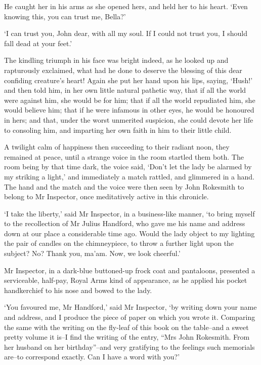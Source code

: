 He caught her in his arms as she opened hers, and held her to his heart.
‘Even knowing this, you can trust me, Bella?’

‘I can trust you, John dear, with all my soul. If I could not trust you,
I should fall dead at your feet.’

The kindling triumph in his face was bright indeed, as he looked up and
rapturously exclaimed, what had he done to deserve the blessing of this
dear confiding creature’s heart! Again she put her hand upon his lips,
saying, ‘Hush!’ and then told him, in her own little natural pathetic
way, that if all the world were against him, she would be for him; that
if all the world repudiated him, she would believe him; that if he were
infamous in other eyes, he would be honoured in hers; and that, under
the worst unmerited suspicion, she could devote her life to consoling
him, and imparting her own faith in him to their little child.

A twilight calm of happiness then succeeding to their radiant noon, they
remained at peace, until a strange voice in the room startled them both.
The room being by that time dark, the voice said, ‘Don’t let the lady
be alarmed by my striking a light,’ and immediately a match rattled, and
glimmered in a hand. The hand and the match and the voice were then seen
by John Rokesmith to belong to Mr Inspector, once meditatively active in
this chronicle.

‘I take the liberty,’ said Mr Inspector, in a business-like manner, ‘to
bring myself to the recollection of Mr Julius Handford, who gave me his
name and address down at our place a considerable time ago. Would the
lady object to my lighting the pair of candles on the chimneypiece, to
throw a further light upon the subject? No? Thank you, ma’am. Now, we
look cheerful.’

Mr Inspector, in a dark-blue buttoned-up frock coat and pantaloons,
presented a serviceable, half-pay, Royal Arms kind of appearance, as he
applied his pocket handkerchief to his nose and bowed to the lady.

‘You favoured me, Mr Handford,’ said Mr Inspector, ‘by writing down your
name and address, and I produce the piece of paper on which you wrote
it. Comparing the same with the writing on the fly-leaf of this book on
the table--and a sweet pretty volume it is--I find the writing of the
entry, “Mrs John Rokesmith. From her husband on her birthday”--and very
gratifying to the feelings such memorials are--to correspond exactly.
Can I have a word with you?’


